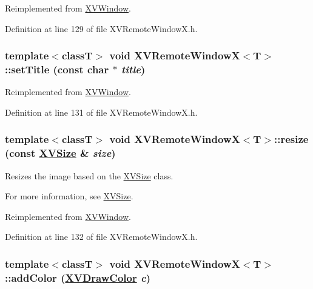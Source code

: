 Reimplemented from \hyperlink{class_XVWindow}{XVWindow}.

Definition at line 129 of file XVRemote\-Window\-X.h.\label{XVRemoteWindowX_a8}
\hypertarget{class_XVRemoteWindowX_a8}{
\subsubsection[setTitle]{\setlength{\rightskip}{0pt plus 5cm}template$<$classT$>$ void XVRemote\-Window\-X$<$T$>$::set\-Title (const char $\ast$ {\em title})}}




Reimplemented from \hyperlink{class_XVWindow}{XVWindow}.

Definition at line 131 of file XVRemote\-Window\-X.h.\label{XVRemoteWindowX_a9}
\hypertarget{class_XVRemoteWindowX_a9}{
\subsubsection[resize]{\setlength{\rightskip}{0pt plus 5cm}template$<$classT$>$ void XVRemote\-Window\-X$<$T$>$::resize (const \hyperlink{class_XVSize}{XVSize} \& {\em size})}}


Resizes the image based on the \hyperlink{class_XVSize}{XVSize} class.

For more information, see \hyperlink{class_XVSize}{XVSize}. 

Reimplemented from \hyperlink{class_XVWindow_a4}{XVWindow}.

Definition at line 132 of file XVRemote\-Window\-X.h.\label{XVRemoteWindowX_a27}
\hypertarget{class_XVRemoteWindowX_a27}{
\subsubsection[addColor]{\setlength{\rightskip}{0pt plus 5cm}template$<$classT$>$ void XVRemote\-Window\-X$<$T$>$::add\-Color (\hyperlink{class_XVDrawColor}{XVDraw\-Color} {\em c})}}




